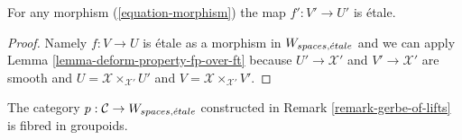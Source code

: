 \begin{lemma}
\label{lemma-morphisms-lifts-etale}
For any morphism (\ref{equation-morphism}) the map $f' : V' \to U'$ is \'etale.
\end{lemma}

\begin{proof}
Namely $f : V \to U$ is \'etale as a morphism in $W_{spaces, {\acute{e}tale}}$
and we can apply
Lemma \ref{lemma-deform-property-fp-over-ft} because $U' \to \mathcal{X}'$
and $V' \to \mathcal{X}'$ are smooth and
$U = \mathcal{X} \times_{\mathcal{X}'} U'$ and
$V = \mathcal{X} \times_{\mathcal{X}'} V'$.
\end{proof}

\begin{lemma}
\label{lemma-gerbe-of-lifts-fibred}
The category $p : \mathcal{C} \to W_{spaces, {\acute{e}tale}}$ constructed
in Remark \ref{remark-gerbe-of-lifts} is fibred in groupoids.
\end{lemma}

